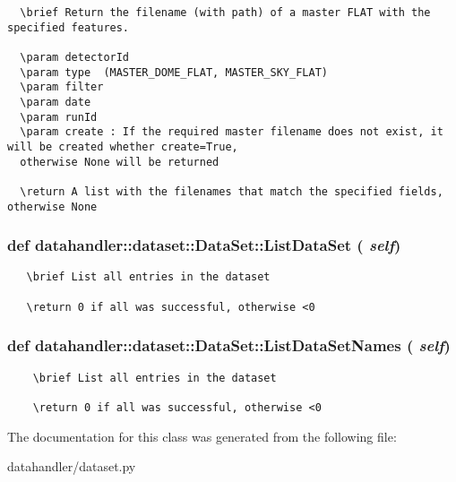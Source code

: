 \footnotesize\begin{verbatim}
  \brief Return the filename (with path) of a master FLAT with the specified features.

  \param detectorId
  \param type  (MASTER_DOME_FLAT, MASTER_SKY_FLAT)
  \param filter
  \param date
  \param runId
  \param create : If the required master filename does not exist, it will be created whether create=True,
  otherwise None will be returned
  
  \return A list with the filenames that match the specified fields, otherwise None
\end{verbatim}
\normalsize
\subsubsection{\setlength{\rightskip}{0pt plus 5cm}def datahandler::dataset::Data\-Set::List\-Data\-Set ( {\em self})}\label{classdatahandler_1_1dataset_1_1DataSet_1cf30f985e2a341f8ee1d48abe4772ad}




\footnotesize\begin{verbatim}
   \brief List all entries in the dataset

   \return 0 if all was successful, otherwise <0
\end{verbatim}
\normalsize
\subsubsection{\setlength{\rightskip}{0pt plus 5cm}def datahandler::dataset::Data\-Set::List\-Data\-Set\-Names ( {\em self})}\label{classdatahandler_1_1dataset_1_1DataSet_c211207442ef156a929c455d97bfd6a4}




\footnotesize\begin{verbatim}
    \brief List all entries in the dataset

    \return 0 if all was successful, otherwise <0
\end{verbatim}
\normalsize
 

The documentation for this class was generated from the following file:\begin{CompactItemize}
\item 
datahandler/dataset.py\end{CompactItemize}
